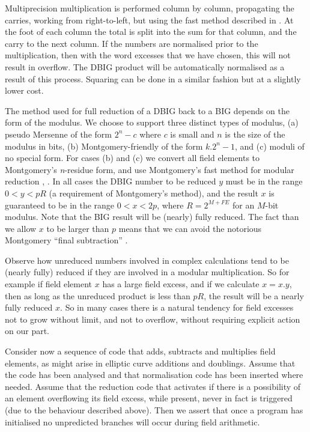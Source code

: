 \documentclass{llncs}
\begin{document}
Multiprecision multiplication is performed column by column, propagating the carries, working from right-to-left, but using the fast method described in \cite{scott2}.
At the foot of each column the total is split into the sum for that column, and the carry to the next column. If the numbers are normalised 
prior to the multiplication, then 
with the word excesses that we have chosen, this will not result in overflow. The {DBIG} product will be automatically normalised as a result of this process. Squaring can be done in a 
similar fashion but at a slightly lower cost. 


The method used for full reduction of a DBIG back to a BIG depends on the form of the modulus. We choose to support three distinct types of modulus, (a) pseudo Mersenne of the form $2^n-c$ where 
$c$ is small and $n$ is the size of the modulus in bits, 
(b) Montgomery-friendly of the form $k.2^n-1$, and (c) moduli of no special form. For cases (b) and (c) we convert all 
field elements to Montgomery's {\it n}-residue form, and use Montgomery's fast method for modular reduction \cite{montgomery}, \cite{scott2}. In all cases the DBIG number to be reduced $y$ must be in the 
range $0<y<pR$ (a requirement of Montgomery's method), and the result $x$ is guaranteed to 
be in the range $0<x<2p$, where $R=2^{M+FE}$ for an $M$-bit modulus. Note that the BIG result will be (nearly) fully reduced. The fact than we allow $x$ to be larger than $p$ means that we can avoid
the notorious Montgomery ``final subtraction'' \cite{montgomery}.

Observe how unreduced numbers involved in complex calculations tend to be (nearly fully) reduced if they are involved in a modular multiplication. So for example if field element $x$ has a large field excess,
and if we calculate $x=x.y$, then as long as the unreduced product is less than $pR$, the result will be a nearly fully reduced $x$. So in many cases there is a natural tendency for field excesses 
not to grow without limit, and not to overflow, without requiring explicit action on our part.

Consider now a sequence of code that adds, subtracts and multiplies field elements, as might arise in elliptic curve additions and doublings. Assume that the code has been analysed and that normalisation 
code has been inserted where needed. Assume that the reduction code that 
activates if there is a possibility of an element overflowing its field excess, while present, never in fact is triggered (due to the behaviour described above). Then we assert that once a program has initialised 
no unpredicted branches will occur during field arithmetic. 
\end{document}
